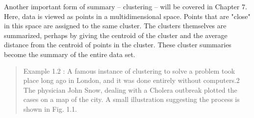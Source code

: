 \documentclass[a4paper, 11pt]{article} %
\begin{document}
Another important form of summary – clustering – will be covered in Chapter
7. Here, data is viewed as points in a multidimensional space. Points
that are "close" in this space are assigned to the same cluster. The clusters
themselves are summarized, perhaps by giving the centroid of the cluster and
the average distance from the centroid of points in the cluster. These cluster
summaries become the summary of the entire data set.\\

\begin{quote}
Example 1.2 : A famous instance of clustering to solve a problem took place
long ago in London, and it was done entirely without computers.2 The physician
John Snow, dealing with a Cholera outbreak plotted the cases on a map of the
city. A small illustration suggesting the process is shown in Fig. 1.1.
\end{quote}

\end{document}
